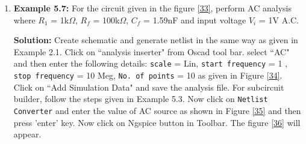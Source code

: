 \begin{enumerate}
\item \textbf{Example 5.7:} For the circuit given in the figure \ref{33}, perform AC analysis where $R_1$ = 1k$\Omega$, $R_f$ = 100k$\Omega$, $C_f$ = 1.59nF and input voltage $V_i$ = 1V A.C.

\textbf{Solution:}
Create schematic and generate netlist in the same way as given in Example 2.1.
Click on ``analysis inserter" from Oscad tool bar.
select ``AC" and then enter the following details:
{\tt scale} = Lin, {\tt start frequency} = 1 , {\tt stop frequency} = 10 Meg, {\tt No. of points} = 10 as given in Figure \ref{34}. Click on ``Add Simulation Data" and save the analysis file.
For subcircuit builder, follow the steps given in Example 5.3.
Now click on {\tt Netlist Converter} and enter the value of AC source as shown in Figure \ref{35} and then press 'enter' key. Now click on Ngspice button in Toolbar. The figure \ref{36} will appear.


\end{enumerate}
